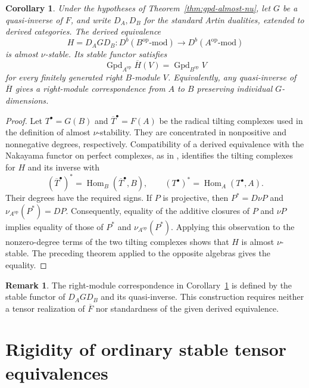 \documentclass[12pt,a4paper,english,reqno]{amsart}
\numberwithin{equation}{section}
\theoremstyle{plain}
\newtheorem{corollary}[theorem]{Corollary}
\theoremstyle{definition}
\newtheorem{remark}[theorem]{Remark}
\begin{document}
\begin{corollary}
\label{cor:gpd-almost-nu-opposite}
Under the hypotheses of Theorem~\ref{thm:gpd-almost-nu}, let $G$ be a
quasi-inverse of $F$, and write $D_A,D_B$ for the standard Artin
dualities, extended to derived categories.  The derived equivalence
\[
 H=D_A G D_B:
 D^b(B^{\mathrm{op}}\text{-}\mathrm{mod})
 \longrightarrow D^b(A^{\mathrm{op}}\text{-}\mathrm{mod})
\]
is almost $\nu$-stable.  Its stable functor satisfies
\[
 \operatorname{Gpd}_{A^{\mathrm{op}}}\overline H(V)
   =\operatorname{Gpd}_{B^{\mathrm{op}}}V
\]
for every finitely generated right $B$-module $V$.  Equivalently,
any quasi-inverse of $\overline H$ gives a right-module
correspondence from $A$ to $B$ preserving individual $G$-dimensions.
\end{corollary}

\begin{proof}
Let $T^\bullet=G(B)$ and $\overline T^\bullet=F(A)$ be the radical
tilting complexes used in the definition of almost $\nu$-stability.
They are concentrated in nonpositive and nonnegative degrees,
respectively.  Compatibility of a derived equivalence with the
Nakayama functor on perfect complexes, as in
\cite[Lemma~2.3 and the discussion preceding it]{HuXi2010}, identifies
the tilting complexes for $H$ and its inverse with
\[
 (\overline T^\bullet)^*
   =\operatorname{Hom}_B(\overline T^\bullet,B),
 \qquad
 (T^\bullet)^*=\operatorname{Hom}_A(T^\bullet,A).
\]
Their degrees have the required signs.  If $P$ is projective, then
$P^*=D\nu P$ and $\nu_{A^{\mathrm{op}}}(P^*)=DP$.
Consequently, equality of the additive closures of $P$ and $\nu P$
implies equality of those of $P^*$ and
$\nu_{A^{\mathrm{op}}}(P^*)$.  Applying this observation to the
nonzero-degree terms of the two tilting complexes shows that $H$ is
almost $\nu$-stable.  The preceding theorem applied to the opposite
algebras gives the equality.
\end{proof}

\begin{remark}
The right-module correspondence in
Corollary~\ref{cor:gpd-almost-nu-opposite} is defined by the stable
functor of $D_A G D_B$ and its quasi-inverse.  This construction
requires neither a tensor realization of $\overline F$ nor standardness
of the given derived equivalence.
\end{remark}

\section{Rigidity of ordinary stable tensor equivalences}
\label{sec:ordinary-stable-rigidity}
\end{document}
